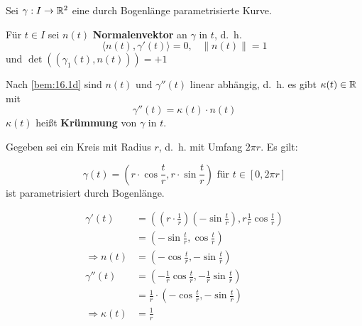 \begin{definition}%
    Sei $\gamma: I \rightarrow \mathbb{R}^2$ eine durch Bogenlänge
    parametrisierte Kurve.

    \begin{defenum}
        \item Für $t \in I$ sei $n(t)$ \textbf{Normalenvektor}
              an $\gamma$ in $t$, d.~h.
              \[\langle n(t), \gamma'(t) \rangle = 0, \;\;\; \|n(t)\|=1 \]
              und $\det((\gamma_1(t), n(t))) = +1$
        \item Nach \cref{bem:16.1d} sind $n(t)$ und $\gamma''(t)$ linear
              abhängig, d.~h. es gibt $\kappa(t) \in \mathbb{R}$ mit
              \[\gamma''(t) = \kappa(t) \cdot n(t)\]
              $\kappa(t)$ heißt \textbf{Krümmung}
              von $\gamma$ in $t$.
    \end{defenum}
\end{definition}

\begin{beispiel}%
    Gegeben sei ein Kreis mit Radius $r$, d.~h. mit Umfang $2\pi r$.
    Es gilt:

    \[\gamma(t) = (r \cdot \cos \frac{t}{r}, r \cdot \sin \frac{t}{r}) \text{ für } t \in [0, 2\pi r]\]
    ist parametrisiert durch Bogenlänge.

    \begin{align*}
        \gamma'(t)  &= ((r \cdot \frac{1}{r}) (- \sin \frac{t}{r}), r \frac{1}{r} \cos \frac{t}{r})\\
                    &= (- \sin \frac{t}{r}, \cos \frac{t}{r})\\
        \Rightarrow n(t) &= (- \cos \frac{t}{r}, - \sin \frac{t}{r})\\
        \gamma''(t) &= (- \frac{1}{r} \cos \frac{t}{r}, - \frac{1}{r} \sin \frac{t}{r})\\
                    &= \frac{1}{r} \cdot (- \cos \frac{t}{r}, - \sin \frac{t}{r})\\
        \Rightarrow \kappa(t) &= \frac{1}{r}
    \end{align*}
\end{beispiel}


